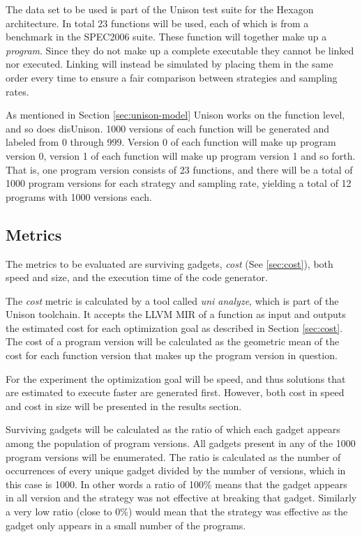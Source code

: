 The data set to be used is part of the Unison test suite for the Hexagon architecture. In
total 23 functions will be used, each of which is from a benchmark in the SPEC2006 suite.
These function will together make up a \textit{program}. Since they do not make up a
complete executable they cannot be linked nor executed. Linking will instead be simulated
by placing them in the same order every time to ensure a fair comparison between
strategies and sampling rates.

As mentioned in Section \ref{sec:unison-model} Unison works on the function level, and so
does disUnison. 1000 versions of each function will be generated and labeled from 0 through
999. Version 0 of each function will make up program version 0, version 1 of each function
will make up program version 1 and so forth. That is, one program version consists of 23
functions, and there will be a total of 1000 program versions for each strategy and
sampling rate, yielding a total of 12 programs with 1000 versions each.

\subsection{Metrics}
\label{sec:metrics}

The metrics to be evaluated are surviving gadgets, \textit{cost} (See \ref{sec:cost}),
both speed and size, and the execution time of the code generator.

The \textit{cost} metric is calculated by a tool called \textit{uni analyze}, which is
part of the Unison toolchain. It accepts the LLVM MIR of a function as input and outputs
the estimated cost for each optimization goal as described in Section \ref{sec:cost}. The
cost of a program version will be calculated as the geometric mean of the cost for each
function version that makes up the program version in question.

For the experiment the optimization goal will be speed, and thus solutions that are
estimated to execute faster are generated first. However, both cost in speed and cost in
size will be presented in the results section.

Surviving gadgets will be calculated as the ratio of which each gadget appears among the
population of program versions. All gadgets present in any of the 1000 program versions
will be enumerated. The ratio is calculated as the number of occurrences of every unique
gadget divided by the number of versions, which in this case is 1000. In other words a
ratio of 100\% means that the gadget appears in all version and the strategy was not
effective at breaking that gadget. Similarly a very low ratio (close to 0\%) would mean
that the strategy was effective as the gadget only appears in a small number of the
programs.

